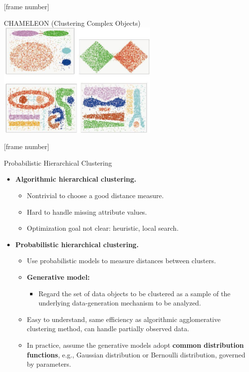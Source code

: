 \documentclass[aspectratio=169,t,xcolor=dvipsnames]{beamer}
\begin{document}
  {
    [frame number]
    \begin{frame}{CHAMELEON (Clustering Complex Objects)}
      \centering
      \includegraphics[width=0.6\textwidth]{img/cluster.jpeg}
    \end{frame}
  }

  {
    [frame number]
    \begin{frame}{Probabilistic Hierarchical Clustering}
      \centering
      \begin{itemize}
        \item \textbf{Algorithmic hierarchical clustering.}
        \begin{itemize}
          \item Nontrivial to choose a good distance measure.
          \item Hard to handle missing attribute values.
          \item Optimization goal not clear: heuristic, local search.
        \end{itemize}
        \item \textbf{Probabilistic hierarchical clustering.}
        \begin{itemize}
          \item Use probabilistic models to measure distances between clusters.
          \item \textbf{\color{airforceblue}Generative model:}
          \begin{itemize}
            \item Regard the set of data objects to be clustered as a sample of the underlying data-generation mechanism to be analyzed.
          \end{itemize}
          \item Easy to understand, same efficiency as algorithmic agglomerative clustering method, can handle partially observed data.
          \item In practice, assume the generative models adopt \textbf{\color{airforceblue}common distribution functions}, e.g., Gaussian distribution or Bernoulli distribution, governed by parameters.
        \end{itemize}
      \end{itemize}
    \end{frame}
  }
\end{document}

